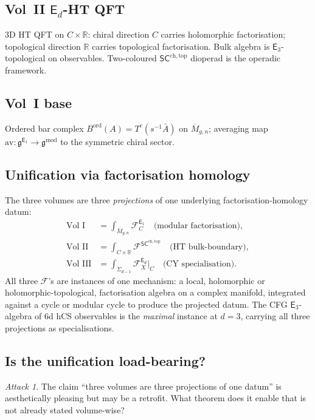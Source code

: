 \documentclass[11pt]{article}
\theoremstyle{definition}
\theoremstyle{remark}
\newtheorem{attack}[theorem]{Attack}
\providecommand{\R}{\mathbb{R}}
\providecommand{\cF}{\mathcal{F}}
\providecommand{\fg}{\mathfrak{g}}
\providecommand{\Eone}{\mathsf{E}_1}
\providecommand{\Ethree}{\mathsf{E}_3}
\providecommand{\Ed}{\mathsf{E}_d}
\begin{document}
\subsection{Vol~II $\Ed$-HT QFT}

3D HT QFT on $C\times\R$: chiral direction $C$ carries holomorphic
factorisation; topological direction $\R$ carries topological
factorisation. Bulk algebra is $\Ethree$-topological on observables.
Two-coloured $\mathsf{SC}^{\mathrm{ch,top}}$ dioperad is the operadic
framework.

\subsection{Vol~I base}

Ordered bar complex $B^{\mathrm{ord}}(A) = T^c(s^{-1}\bar A)$ on
$\overline{M}_{g,n}$; averaging map
$\mathrm{av}\colon\fg^{\Eone}\to\fg^{\mathrm{mod}}$ to the symmetric
chiral sector.

\subsection{Unification via factorisation homology}

The three volumes are three \emph{projections} of one underlying
factorisation-homology datum:
\begin{align*}
\text{Vol~I} &= \int_{\overline{M}_{g,n}} \cF^{\Eone}_C \quad
\text{(modular factorisation)}, \\
\text{Vol~II} &= \int_{C\times\R} \cF^{\mathsf{SC}^{\mathrm{ch,top}}} \quad
\text{(HT bulk-boundary)}, \\
\text{Vol~III} &= \int_{\Sigma_{d-1}}\cF^{\Ed}_X\big|_C \quad
\text{(CY specialisation)}.
\end{align*}
All three $\cF$'s are instances of one mechanism: a local, holomorphic
or holomorphic-topological, factorisation algebra on a complex
manifold, integrated against a cycle or modular cycle to produce the
projected datum. The CFG $\Ethree$-algebra of 6d hCS observables is the
\emph{maximal} instance at $d = 3$, carrying all three projections as
specialisations.

\subsection{Is the unification load-bearing?}

\begin{attack}
The claim ``three volumes are three projections of one datum'' is
aesthetically pleasing but may be a retrofit. What theorem does it
enable that is not already stated volume-wise?
\end{attack}
\end{document}
